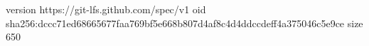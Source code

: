 version https://git-lfs.github.com/spec/v1
oid sha256:dccc71ed68665677faa769bf5e668b807d4af8c4d4ddccdeff4a375046c5e9ce
size 650
